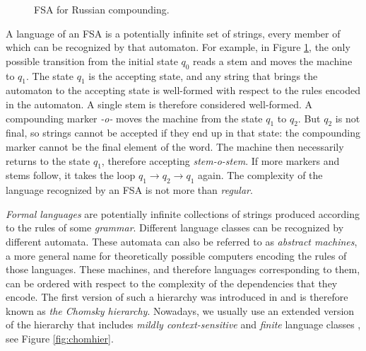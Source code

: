 \begin{figure}[h!]
\centering
{}
\caption{FSA for Russian compounding.}
\label{fig:ruscompounding}
\end{figure}


A language of an FSA is a potentially infinite set of strings, every member of which can be recognized by that automaton.
For example, in Figure \ref{fig:ruscompounding}, the only possible transition from the initial state $q_0$ reads a stem and moves the machine to $q_1$.
The state $q_1$ is the accepting state, and any string that brings the automaton to the accepting state is well-formed with respect to the rules encoded in the automaton.
A single stem is therefore considered well-formed.
A compounding marker \emph{-o-} moves the machine from the state $q_1$ to $q_2$.
But $q_2$ is not final, so strings cannot be accepted if they end up in that state: the compounding marker cannot be the final element of the word.
The machine then necessarily returns to the state $q_1$, therefore accepting \emph{stem-o-stem}.
If more markers and stems follow, it takes the loop $q_1\rightarrow q_2\rightarrow q_1$ again.
The complexity of the language recognized by an FSA is not more than \emph{regular}.


\emph{Formal languages} are potentially infinite collections of strings produced according to the rules of some \emph{grammar}.
Different language classes can be recognized by different automata.
These automata can also be referred to as \emph{abstract machines}, a more general name for theoretically possible computers encoding the rules of those languages.
These machines, and therefore languages corresponding to them, can be ordered with respect to the complexity of the dependencies that they encode.
The first version of such a hierarchy was introduced in \cite{Chomsky1956} and is therefore known as \emph{the Chomsky hierarchy}.
Nowadays, we usually use an extended version of the hierarchy that includes \emph{mildly context-sensitive} and \emph{finite} language classes \citep{JagerRogers12}, see Figure \ref{fig:chomhier}.



